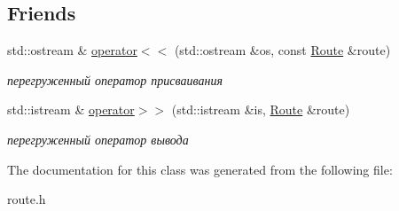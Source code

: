 \subsection*{Friends}
\begin{DoxyCompactItemize}
\item 
\hypertarget{class_route_a94d3389e7e325aa8f7394d34db5a33e0}{}std\+::ostream \& \hyperlink{class_route_a94d3389e7e325aa8f7394d34db5a33e0}{operator$<$$<$} (std\+::ostream \&os, const \hyperlink{class_route}{Route} \&route)\label{class_route_a94d3389e7e325aa8f7394d34db5a33e0}

\begin{DoxyCompactList}\small\item\em перегруженный оператор присваивания \end{DoxyCompactList}\item 
\hypertarget{class_route_a48a68fb58c2b4902ca84058f33303c36}{}std\+::istream \& \hyperlink{class_route_a48a68fb58c2b4902ca84058f33303c36}{operator$>$$>$} (std\+::istream \&is, \hyperlink{class_route}{Route} \&route)\label{class_route_a48a68fb58c2b4902ca84058f33303c36}

\begin{DoxyCompactList}\small\item\em перегруженный оператор вывода \end{DoxyCompactList}\end{DoxyCompactItemize}


The documentation for this class was generated from the following file\+:\begin{DoxyCompactItemize}
\item 
route.\+h\end{DoxyCompactItemize}
